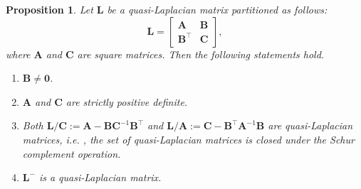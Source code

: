 \documentclass[12pt]{article}
\theoremstyle{plain}
\newtheorem{proposition}{Proposition}
\theoremstyle{remark}
\newcommand{\ie}{\textit{i.e. }}
\newcommand{\latMatr}[1]{\mathbf{#1}}          %
\newcommand{\grMatr}[1]{{\boldsymbol{#1}}}   %
\begin{document}
    \begin{proposition}
        \label{prop:quasiLaplacianProperties}
        Let $\latMatr L$ be a quasi-Laplacian matrix partitioned as follows: 
        \begin{equation}
            \label{eq:partitionQuasiLapl}
            {\latMatr{L}}=\begin{bmatrix}
                {\latMatr{A}} & {\latMatr{B}}\\
                {\latMatr{B}}^\top & {\latMatr{C}}
            \end{bmatrix},
        \end{equation}
        where ${\latMatr{A}}$ and ${\latMatr{C}}$ are square matrices. Then the following statements hold.
        \begin{enumerate}
            \item ${\latMatr{B}}\ne \grMatr 0$.
            \item ${\latMatr{A}}$ and ${\latMatr{C}}$ are strictly positive definite.
            \item Both ${\latMatr{L}}/{\latMatr{C}}:={\latMatr{A}}-{\latMatr{B}} {\latMatr{C}}^{-1} {\latMatr{B}}^\top$ and ${\latMatr{L}}/{\latMatr{A}}:={\latMatr{C}} - {\latMatr{B}}^\top {\latMatr{A}}^{-1} {\latMatr{B}}$ are quasi-Laplacian matrices, \ie, the set of quasi-Laplacian matrices is closed under the Schur complement operation.
            \item ${\latMatr{L}}^-$ is a quasi-Laplacian matrix.
        \end{enumerate}
    \end{proposition}
\end{document}
